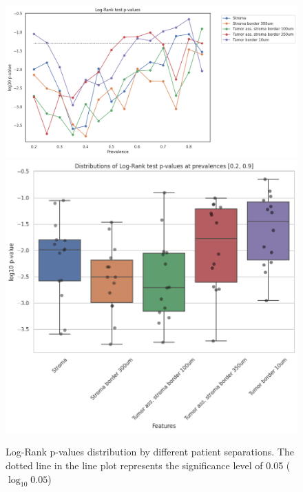 \begin{figure}[h!]
\includegraphics[width=\linewidth]{figures/survival/pvalue_prevalence_all.png}
\includegraphics[width=0.764\linewidth]{figures/survival/pvalue_boxplot_all.png}
\caption{Log-Rank p-values distribution by different patient separations.
The dotted line in the line plot represents the significance level of 0.05 ($\log_{10} 0.05$)}
\label{fig:pvalues_tils}
\end{figure}

